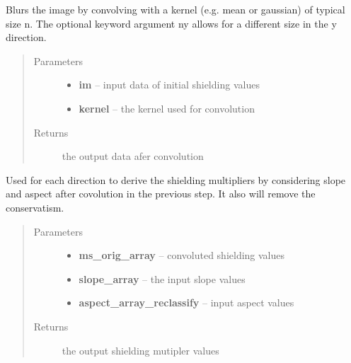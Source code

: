 \documentclass[letterpaper,10pt,english]{sphinxmanual}
\begin{document}
\begin{fulllineitems}
\label{docs/shielding:shield_mult.blur_image}
Blurs the image by convolving with a kernel (e.g. mean or gaussian) of
typical size n. The optional keyword argument ny allows for a different
size in the y direction.
\begin{quote}\begin{description}
\item[{Parameters}] \leavevmode\begin{itemize}
\item {} 
\textbf{im} --  input data of initial shielding values

\item {} 
\textbf{kernel} --  the kernel used for convolution

\end{itemize}

\item[{Returns}] \leavevmode
{} the output data afer convolution

\end{description}\end{quote}

\end{fulllineitems}



\begin{fulllineitems}
\label{docs/shielding:shield_mult.combine}
Used for each direction to derive the shielding multipliers by considering
slope and aspect after covolution in the previous step. It also will remove
the conservatism.
\begin{quote}\begin{description}
\item[{Parameters}] \leavevmode\begin{itemize}
\item {} 
\textbf{ms\_orig\_array} --  convoluted shielding values

\item {} 
\textbf{slope\_array} --  the input slope values

\item {} 
\textbf{aspect\_array\_reclassify} --  input aspect values

\end{itemize}

\item[{Returns}] \leavevmode
{} the output shielding mutipler values

\end{description}\end{quote}

\end{fulllineitems}
\end{document}
